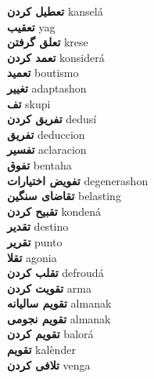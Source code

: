 \textbf{ تعطیل کردن  } kanselá \\
\textbf{ تعقیب  } yag \\
\textbf{ تعلق گرفتن  } krese \\
\textbf{ تعمد کردن  } konsiderá \\
\textbf{ تعمید  } boutismo \\
\textbf{ تغییر  } adaptashon \\
\textbf{ تف  } skupi \\
\textbf{ تفریق کردن  } dedusí \\
\textbf{ تفریق  } deduccion \\
\textbf{ تفسیر  } aclaracion \\
\textbf{ تفوق  } bentaha \\
\textbf{ تفویض اختیارات  } degenerashon \\
\textbf{ تقاضای سنگین  } belasting \\
\textbf{ تقبیح کردن  } kondená \\
\textbf{ تقدیر  } destino \\
\textbf{ تقریر  } punto \\
\textbf{ تقلا  } agonia \\
\textbf{ تقلب کردن  } defroudá \\
\textbf{ تقویت کردن  } arma \\
\textbf{ تقویم سالیانه  } almanak \\
\textbf{ تقویم نجومی  } almanak \\
\textbf{ تقویم کردن  } balorá \\
\textbf{ تقویم  } kalènder \\
\textbf{ تلافی کردن  } venga \\
